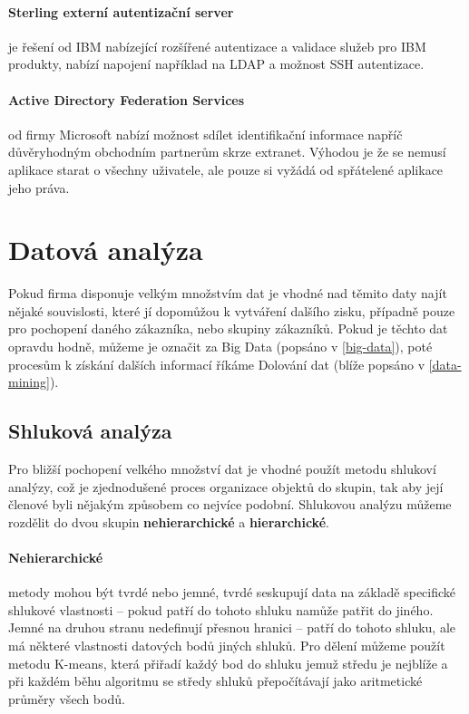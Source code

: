 \paragraph{Sterling externí autentizační server} je řešení od IBM nabízející rozšířené autentizace a validace služeb pro IBM produkty, nabízí napojení například na LDAP a možnost SSH autentizace. \cite{ibm-ster}
\paragraph{Active Directory Federation Services} od firmy Microsoft nabízí možnost sdílet identifikační informace napříč důvěryhodným obchodním partnerům skrze extranet. Výhodou je že se nemusí aplikace starat o všechny uživatele, ale pouze si vyžádá od spřátelené aplikace jeho práva. \cite{ADFS}

\section{Datová analýza}
\par Pokud firma disponuje velkým množstvím dat je vhodné nad těmito daty najít nějaké souvislosti, které jí dopomůžou k vytváření dalšího zisku, případně pouze pro pochopení daného zákazníka, nebo skupiny zákazníků. Pokud je těchto dat opravdu hodně, můžeme je označit za Big Data (popsáno v \ref{big-data}), poté procesům k získání dalších informací říkáme Dolování dat (blíže popsáno v \ref{data-mining}).

\subsection{Shluková analýza}
\par Pro bližší pochopení velkého množství dat je vhodné použít metodu shlukoví analýzy, což je zjednodušené proces organizace objektů do skupin, tak aby její členové byli nějakým způsobem co nejvíce podobní. Shlukovou analýzu můžeme rozdělit do dvou skupin \textbf{nehierarchické} a \textbf{hierarchické}.

\paragraph{Nehierarchické} metody mohou být tvrdé nebo jemné, tvrdé seskupují data na základě specifické shlukové vlastnosti -- pokud patří do tohoto shluku namůže patřit do jiného. Jemné na druhou stranu nedefinují přesnou hranici -- patří do tohoto shluku, ale má některé vlastnosti datových bodů jiných shluků. Pro dělení můžeme použít metodu K-means, která přiřadí každý bod do shluku jemuž středu je nejblíže a při každém běhu algoritmu se středy shluků přepočítávají jako aritmetické průměry všech bodů.

